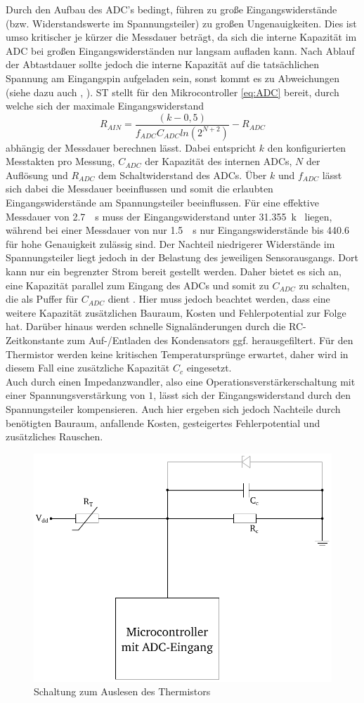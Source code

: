 Durch den Aufbau des ADC's bedingt, führen zu große Eingangswiderstände (bzw. Widerstandswerte im Spannungsteiler) zu großen Ungenauigkeiten. Dies ist umso kritischer je kürzer die Messdauer beträgt, da sich die interne Kapazität im ADC bei großen Eingangswiderständen nur langsam aufladen kann. Nach Ablauf der Abtastdauer sollte  jedoch die interne Kapazität auf die tatsächlichen Spannung am Eingangspin aufgeladen sein, sonst kommt es zu Abweichungen (siehe dazu auch \cite{ADC}, \cite{stm32}). ST stellt für den Mikrocontroller \autoref{eq:ADC} bereit, durch welche sich der maximale Eingangswiderstand 
\begin{equation} \label{eq:ADC}
R_{AIN} = \frac{(k-0,5)}{f_{ADC} C_{ADC} ln(2^{N+2})} - R_{ADC}
\end{equation}
abhängig der Messdauer berechnen lässt. Dabei entspricht $k$ den konfigurierten Messtakten pro Messung, $C_{ADC}$ der Kapazität des internen ADCs, $N$ der Auflösung und $R_{ADC}$ dem Schaltwiderstand des ADCs. Über $k$ und $f_{ADC}$ lässt sich dabei die Messdauer beeinflussen und somit die erlaubten Eingangswiderstände am Spannungsteiler beeinflussen. Für eine effektive Messdauer von \SI{2,7}{\mu s} muss der Eingangswiderstand unter \SI{31,355}{k\Omega} liegen, während bei einer Messdauer von nur \SI{1,5}{\mu s} nur Eingangswiderstände bis \SI{440,6}{\Omega} für hohe Genauigkeit zulässig sind. Der Nachteil niedrigerer Widerstände im Spannungsteiler liegt jedoch in der Belastung des jeweiligen Sensorausgangs. Dort kann nur ein begrenzter Strom bereit gestellt werden. Daher bietet es sich an, eine Kapazität parallel zum Eingang des ADCs und somit zu $C_{ADC}$ zu schalten, die als Puffer für $C_{ADC}$ dient \cite{ADC}. Hier muss jedoch beachtet werden, dass eine weitere Kapazität zusätzlichen Bauraum, Kosten und Fehlerpotential zur Folge hat. Darüber hinaus werden schnelle Signaländerungen durch die RC-Zeitkonstante zum Auf-/Entladen des Kondensators ggf. herausgefiltert. Für den Thermistor werden keine kritischen Temperatursprünge erwartet, daher wird in diesem Fall eine zusätzliche Kapazität $C_c$ eingesetzt.\\
Auch durch einen Impedanzwandler, also eine Operationsverstärkerschaltung mit einer Spannungsverstärkung von $1$, lässt sich der Eingangswiderstand durch den Spannungsteiler kompensieren. Auch hier ergeben sich jedoch Nachteile durch benötigten Bauraum, anfallende Kosten, gesteigertes Fehlerpotential und zusätzliches Rauschen.\\
\begin{figure}[H]
	\centering
	\includegraphics[width=0.5\linewidth]{./Bilder/fig_ther_elek}
	\caption{Schaltung zum Auslesen des Thermistors}
	\label{fig_ther_elek}
\end{figure}\noindent
